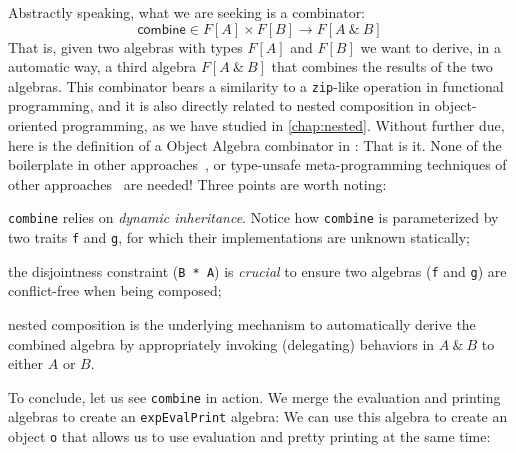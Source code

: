 Abstractly speaking, what we are seeking is a combinator:
\[
  \mathsf{combine} \in F[A] \times F[B] \rightarrow F[A\ \&\ B]
\]
That is, given two algebras with types $F[A]$ and $F[B]$ we want to
derive, in a automatic way, a third algebra $F[A\ \&\ B]$ that combines the results
of the two algebras. This combinator bears a similarity to a
\lstinline{zip}-like operation in functional programming, and it is also directly
related to nested composition in object-oriented programming, as we have studied
in \cref{chap:nested}. Without further due, here is the definition of a Object
Algebra combinator in \sedel:
That is it. None of the boilerplate in other
approaches~\citep{oliveira2012extensibility}, or type-unsafe meta-programming
techniques of other approaches~\citep{oliveira2013feature,rendel14attributes} are
needed! Three points are worth noting:
\begin{inparaenum}[(1)]
\item \lstinline{combine} relies on \emph{dynamic inheritance}. Notice how
  \lstinline{combine} is parameterized by two traits \lstinline{f} and \lstinline{g}, for
  which their implementations are unknown statically;
\item the disjointness constraint (\lstinline{B * A}) is \emph{crucial} to
  ensure two algebras (\lstinline{f} and \lstinline{g}) are conflict-free
  when being composed;
\item nested composition is the underlying mechanism to automatically derive the
  combined algebra by appropriately invoking (delegating) behaviors in $A \ \&\ B$ to either $A$ or $B$.
\end{inparaenum}
To conclude, let us see \lstinline{combine} in action. We merge the evaluation
and printing algebras to create an \lstinline{expEvalPrint} algebra:
We can use this algebra to create an object \lstinline{o} that allows us to use
evaluation and pretty printing at the same time:




